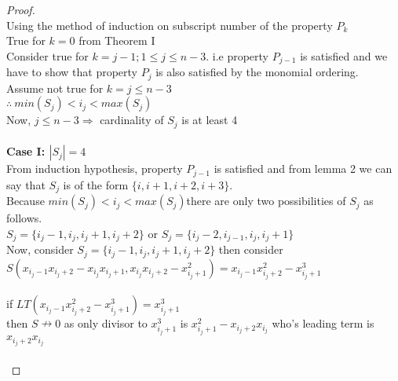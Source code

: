 \documentclass[12pt,a4paper]{article}
\theoremstyle{definition}
\begin{document}
\begin{proof}
\noindent\\
Using the method of induction on subscript number of the property $P_{k}$\\
True for $k = 0$ from Theorem I\\
Consider true for $k = j-1; 1\leq j \leq n-3$. i.e property $P_{j-1}$ is satisfied and we have to show that property $P_{j}$ is also satisfied by the monomial ordering. 
\\
Assume not true for $k = j \leq n-3$
\\
$\therefore \ min(S_{j}) < i_{j} < max(S_{j})$\\
Now, $j \leq n-3 \Rightarrow$ cardinality of $S_j$ is at least 4\\
\\



{\noindent \bf Case I: $|S_j| = 4$}
\\
From induction hypothesis, property $P_{j-1}$ is satisfied and from lemma 2 we can say that $S_{j}$ is of the form $\{i, i+1, i+2 , i+3\}$.\\
Because $min(S_{j}) < i_{j} < max(S_{j})$there are only two possibilities of $S_{j}$ as follows.\\
$S_{j}=\{i_{j}-1, i_{j}, i_{j}+1, i_{j}+2\}$ or $S_{j}=\{i_{j}-2, i_{j-1}, i_{j}, i_{j}+1\}$\\

\noindent Now, consider $S_{j}=\{i_{j}-1, i_{j}, i_{j}+1, i_{j}+2\}$
then consider\\ 
$S(x_{i_{j}-1}x_{i_{j}+2}-x_{i_{j}}x_{i_{j}+1}, x_{i_{j}}x_{i_{j}+2} - x_{i_{j}+1}^{2}) = x_{i_{j}-1}x_{i_{j}+2}^{2}-x_{i_{j}+1}^{3}$\\
\\
if $LT(x_{i_{j}-1}x_{i_{j}+2}^{2}-x_{i_{j}+1}^{3})=x_{i_{j}+1}^3$
\\
then $S\nrightarrow 0$ as only divisor to $x_{i_{j}+1}^3$ is $x_{i_{j}+1}^2-x_{i_{j}+2}x_{i_{j}}$ who's leading term is $x_{i_{j}+2}x_{i_{j}}$\\
\\


\end{proof}
\end{document}
